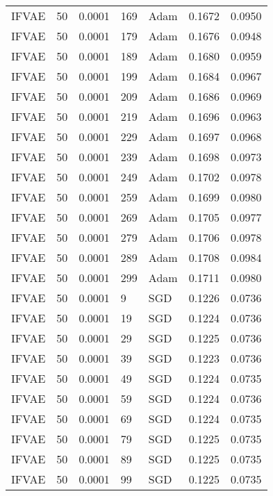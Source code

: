 \begin{tabular}{llrllrr}
 IFVAE &   50 &  0.0001 &   169 &      Adam &  0.1672 &       0.0950 \\
 IFVAE &   50 &  0.0001 &   179 &      Adam &  0.1676 &       0.0948 \\
 IFVAE &   50 &  0.0001 &   189 &      Adam &  0.1680 &       0.0959 \\
 IFVAE &   50 &  0.0001 &   199 &      Adam &  0.1684 &       0.0967 \\
 IFVAE &   50 &  0.0001 &   209 &      Adam &  0.1686 &       0.0969 \\
 IFVAE &   50 &  0.0001 &   219 &      Adam &  0.1696 &       0.0963 \\
 IFVAE &   50 &  0.0001 &   229 &      Adam &  0.1697 &       0.0968 \\
 IFVAE &   50 &  0.0001 &   239 &      Adam &  0.1698 &       0.0973 \\
 IFVAE &   50 &  0.0001 &   249 &      Adam &  0.1702 &       0.0978 \\
 IFVAE &   50 &  0.0001 &   259 &      Adam &  0.1699 &       0.0980 \\
 IFVAE &   50 &  0.0001 &   269 &      Adam &  0.1705 &       0.0977 \\
 IFVAE &   50 &  0.0001 &   279 &      Adam &  0.1706 &       0.0978 \\
 IFVAE &   50 &  0.0001 &   289 &      Adam &  0.1708 &       0.0984 \\
 IFVAE &   50 &  0.0001 &   299 &      Adam &  0.1711 &       0.0980 \\
 IFVAE &   50 &  0.0001 &     9 &       SGD &  0.1226 &       0.0736 \\
 IFVAE &   50 &  0.0001 &    19 &       SGD &  0.1224 &       0.0736 \\
 IFVAE &   50 &  0.0001 &    29 &       SGD &  0.1225 &       0.0736 \\
 IFVAE &   50 &  0.0001 &    39 &       SGD &  0.1223 &       0.0736 \\
 IFVAE &   50 &  0.0001 &    49 &       SGD &  0.1224 &       0.0735 \\
 IFVAE &   50 &  0.0001 &    59 &       SGD &  0.1224 &       0.0736 \\
 IFVAE &   50 &  0.0001 &    69 &       SGD &  0.1224 &       0.0735 \\
 IFVAE &   50 &  0.0001 &    79 &       SGD &  0.1225 &       0.0735 \\
 IFVAE &   50 &  0.0001 &    89 &       SGD &  0.1225 &       0.0735 \\
 IFVAE &   50 &  0.0001 &    99 &       SGD &  0.1225 &       0.0735 \\

\end{tabular}
